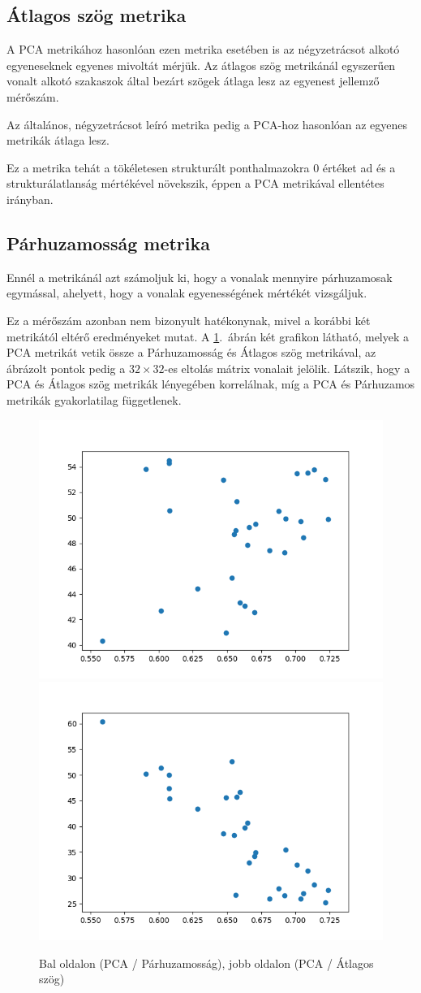 \subsection{Átlagos szög metrika}

A PCA metrikához hasonlóan ezen metrika esetében is az négyzetrácsot alkotó egyeneseknek egyenes mivoltát mérjük. Az átlagos szög metrikánál egyszerűen vonalt alkotó szakaszok által bezárt szögek átlaga lesz az egyenest jellemző mérőszám. 

Az általános, négyzetrácsot leíró metrika pedig a PCA-hoz hasonlóan az egyenes metrikák átlaga lesz.

Ez a metrika tehát a tökéletesen strukturált ponthalmazokra $0$ értéket ad és a strukturálatlanság mértékével növekszik, éppen a PCA metrikával ellentétes irányban.

\subsection{Párhuzamosság metrika}

Ennél a metrikánál azt számoljuk ki, hogy a vonalak mennyire párhuzamosak egymással, ahelyett, hogy a vonalak egyenességének mértékét vizsgáljuk. 

Ez a mérőszám azonban nem bizonyult hatékonynak, mivel a korábbi két metrikától eltérő eredményeket mutat. A \ref{para2}.~ábrán két grafikon látható, melyek a PCA metrikát vetik össze a Párhuzamosság és Átlagos szög metrikával, az ábrázolt pontok pedig a $32\times32$-es eltolás mátrix vonalait jelölik. Látszik, hogy a PCA és Átlagos szög metrikák lényegében korrelálnak, míg a PCA és Párhuzamos metrikák gyakorlatilag függetlenek.

\begin{figure}[h!]
	\begin{center}
	\includegraphics[width=0.45\linewidth]{evr-vs-parallelness-ldim10.png}
		\includegraphics[width=0.45\linewidth]{evr-vs-straightness-ldim10.png}
	\end{center}
  \caption{Bal oldalon (PCA / Párhuzamosság), jobb oldalon (PCA / Átlagos szög)}\label{para2}
\end{figure}

